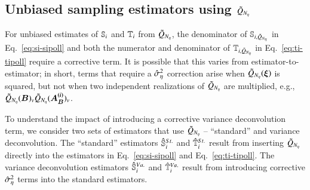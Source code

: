 \subsection{Unbiased sampling estimators using \texorpdfstring{$\Qpoll$}{Qpoll}}
For unbiased estimates of $\S{i}$ and $\T{i}$ from $\Qpoll$, the denominator of $\Spoll{i}$ in Eq.~\eqref{eq:si-sipoll} and both the numerator and denominator of $\Tpoll{i}$ in Eq.~\eqref{eq:ti-tipoll} require a corrective term.
It is possible that this varies from estimator-to-estimator; 
in short, terms that require a $\hatSigsqeta$ correction arise when $\Qpoll(\bxi)$ is squared, but not when two independent realizations of $\Qpoll$ are multiplied, e.g., $\Qpoll(\bm{B})_v \Qpoll(\bm{A_B^{(i)}})_v$. 

To understand the impact of introducing a corrective variance deconvolution term, we consider two sets of estimators that use $\Qpoll$ -- ``standard'' and variance deconvolution. The ``standard'' estimators $\pollSsalt{i}$ and $\pollTsalt{i}$ result from inserting $\Qpoll$ directly into the estimators in Eq.~\eqref{eq:si-sipoll} and Eq.~\eqref{eq:ti-tipoll}. The variance deconvolution estimators $\unpollSsalt{i}$ and $\unpollTsalt{i}$ result from introducing corrective $\hatSigsqeta$ terms into the standard estimators.


